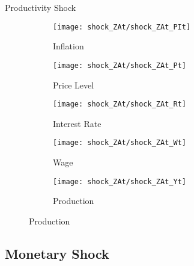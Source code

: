 \documentclass[
presentation.tex
]{subfiles}
\begin{document}
\begin{frame}{Productivity Shock}
	
	\begin{figure}[h!]
		\centering
		\begin{subfigure}[b]{0.3\textwidth}
			\centering
			\texttt{[image: shock\_ZAt/shock\_ZAt\_PIt]}
			\caption{Inflation}
			\label{fig:zat-inflation}
		\end{subfigure}
		\hfill
		\begin{subfigure}[b]{0.3\textwidth}
			\centering
			\texttt{[image: shock\_ZAt/shock\_ZAt\_Pt]}
			\caption{Price Level}
			\label{fig:zat-price}
		\end{subfigure}
		\hfill
		\begin{subfigure}[b]{0.3\textwidth}
			\centering
			\texttt{[image: shock\_ZAt/shock\_ZAt\_Rt]}
			\caption{Interest Rate}
			\label{fig:zat-interest-rate}
		\end{subfigure}
		\hfill
		
		\vspace*{0.5cm}
		
		\hfill
		\begin{subfigure}[b]{0.3\textwidth}
			\centering
			\texttt{[image: shock\_ZAt/shock\_ZAt\_Wt]}
			\caption{Wage}
			\label{fig:zat-wage}
		\end{subfigure}
		\hfill
		\begin{subfigure}[b]{0.3\textwidth}
			\centering
			\texttt{[image: shock\_ZAt/shock\_ZAt\_Yt]}
			\caption{Production}
			\label{fig:zat-production}
		\end{subfigure}
		\hfill
		\hfill
	\end{figure}
	
\end{frame}


\subsection{Monetary Shock}
\end{document}
